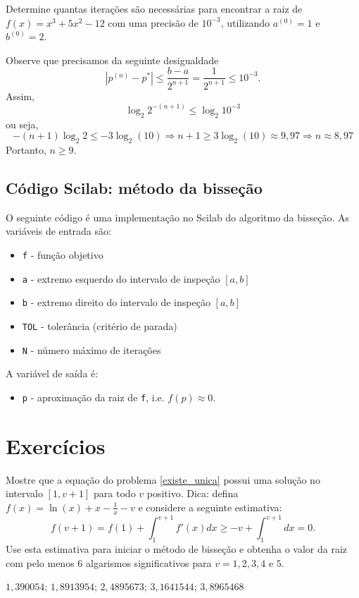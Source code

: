 \begin{ex}Determine quantas iterações são necessárias para encontrar a raiz de $f(x)=x^3+5x^2-12$ com uma precisão de $10^{-3}$, utilizando $a^{(0)}=1$ e $b^{(0)}=2$.

Observe que precisamos da seguinte desigualdade
$$
|p^{(n)}-p^*|\leq \frac{b-a}{2^{n+1}}= \frac{1}{2^{n+1}}\leq 10^{-3}.
$$
Assim,
$$
\log_{2}2^{-(n+1)}\leq \log_{2}10^{-3}
$$
ou seja,
$$
-(n+1)\log_{2}2\leq -3\log_2(10)\Rightarrow  n+1\geq 3\log_2(10)\approx 9,97\Rightarrow  n\approx 8,97
$$
Portanto, $n\geq 9$.
\end{ex}

\ifisscilab
\subsection{Código Scilab: método da bisseção}

O seguinte código é uma implementação no Scilab do algoritmo da bisseção. As variáveis de entrada são:
\begin{itemize}
\item \verb+f+ - função objetivo
\item \verb+a+ - extremo esquerdo do intervalo de inspeção $[a, b]$
\item \verb+b+ - extremo direito do intervalo de inspeção $[a, b]$
\item \verb+TOL+ - tolerância (critério de parada)
\item \verb+N+ - número máximo de iterações
\end{itemize}
A variável de saída é:
\begin{itemize}
\item \verb+p+ - aproximação da raiz de \verb+f+, i.e. $f(p) \approx 0$.
\end{itemize}


\fi

\section*{Exercícios}

\begin{Exercise} Mostre que a equação do problema \ref{existe_unica} possui uma solução no intervalo $[1, v+1]$ para todo $v$ positivo. Dica: defina $f(x)=\ln(x)+x-\frac{1}{x}-v$  e considere a seguinte estimativa:
  \begin{equation*}
    f(v+1)=f(1)+\int_1^{v+1}f'(x)dx\geq -v+\int_1^{v+1}dx=0.  
  \end{equation*}
Use esta estimativa para iniciar o método de bisseção e obtenha o valor da raiz com pelo menos 6 algarismos significativos para $v=1, 2, 3, 4$ e $5$.
\end{Exercise}
\begin{Answer}
  \begin{tiny}
    $1,390054$; $1,8913954$; $2,4895673$; $3,1641544$; $3,8965468$    
  \end{tiny}
\end{Answer}

